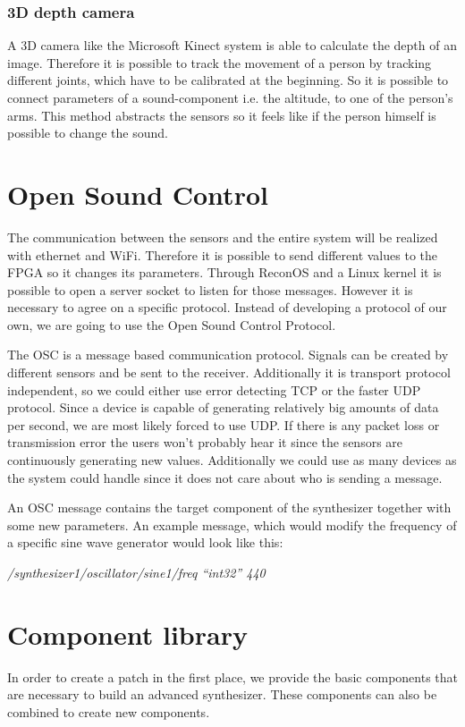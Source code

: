 \subsubsection{3D depth camera}
A 3D camera like the Microsoft Kinect system is able to calculate the depth of an image. 
Therefore it is possible to track the movement of a person by tracking different joints, which have to be calibrated at the beginning. 
So it is possible to connect parameters of a sound-component i.e. the altitude, to one of the person's arms. 
This method abstracts the sensors so it feels like if the person himself is possible to change the sound.

\section{Open Sound Control}
The communication between the sensors and the entire system will be realized with ethernet and WiFi. 
Therefore it is possible to send different values to the \ac{FPGA} so it changes its parameters. 
Through \ac{ReconOS} and a Linux kernel it is possible to open a server socket to listen for those messages. 
However it is necessary to agree on a specific protocol. Instead of developing a protocol of our own, we are going to use the Open Sound Control Protocol.

The \ac{OSC} is a message based communication protocol. 
Signals can be created by different sensors and be sent to the receiver. 
Additionally it is transport protocol independent, so we could either use error detecting TCP or the faster UDP protocol. 
Since a device is capable of generating relatively big amounts of data per second, we are most likely forced to use UDP. 
If there is any packet loss or transmission error the users won't probably hear it since the sensors are continuously generating new values. 
Additionally we could use as many devices as the system could handle since it does not care about who is sending a message.

An \ac{OSC} message contains the target component of the synthesizer together with some new parameters. 
An example message, which would modify the frequency of a specific sine wave generator would look like this: 

\emph{/synthesizer1/oscillator/sine1/freq “int32” 440} \\


\section{Component library}
In order to create a patch in the first place, we provide the basic components that are necessary to build an advanced synthesizer. 
These components can also be combined to create new components.




